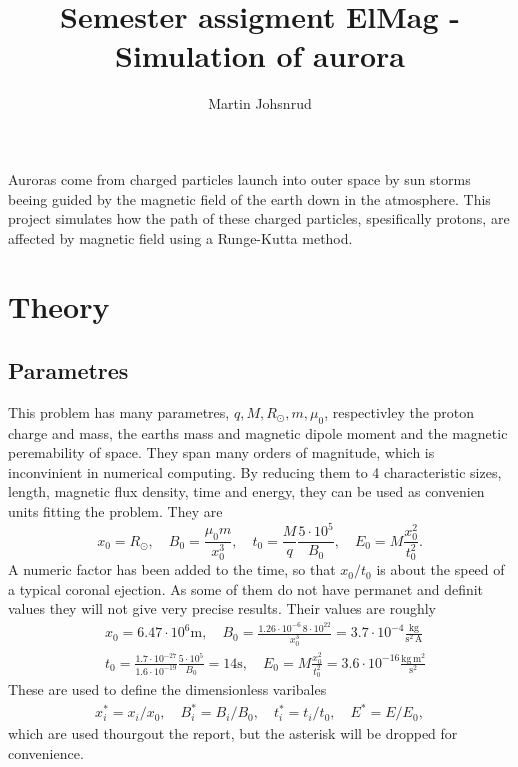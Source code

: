 \documentclass{article}
\title{Semester assigment ElMag - Simulation of aurora}
\author{Martin Johsnrud}
\begin{document}
    \maketitle

    Auroras come from charged particles launch into outer space by sun storms beeing guided by the magnetic field of the earth down in the atmosphere. This project simulates how the path of these charged particles, spesifically protons, are affected by magnetic field using a Runge-Kutta method.
    
    \section*{Theory}
        \subsection*{Parametres}
        This problem has many parametres, $q, M, R_{\odot}, m, \mu_0$, respectivley the proton charge and mass, the earths mass and magnetic dipole moment and the magnetic peremability of space. They span many orders of magnitude, which is inconvinient in numerical computing. By reducing them to 4 characteristic sizes,  length, magnetic flux density, time and energy, they can be used as convenien units fitting the problem. They are
            \begin{equation*}
                x_0 = R_{\odot}, \quad  
                B_0 = \frac{\mu_0 m}{x_0^3}, \quad 
                t_0 = \frac{M}{q}\frac{5\cdot 10^5}{B_0},  \quad 
                E_0 = M\frac{x_0^2}{t_0^2}.
            \end{equation*}
        A numeric factor has been added to the time, so that $x_0 / t_0$ is about the speed of a typical coronal ejection. \cite{Wiki coronal ejections} As some of them do not have permanet and definit values they will not give very precise results. Their values are roughly \cite{Wolfram alpha}
            \begin{align*}
                & x_0 = 6.47 \cdot 10^6 \textrm{m}, \quad
                B_0 = \frac{1.26 \cdot 10^{-6} \, 8 \cdot 10^{22}}{x_0^3} = 3.7 \cdot 10^{-4} \frac{\textrm{kg}}{\textrm{s}^{2} \, \textrm{A}} \\
                &t_0 = \frac{1.7 \cdot 10^{-27}}{1.6\cdot10^{-19}}\frac{5\cdot 10^5}{B_0} = 14 \textrm{s}, \quad 
                E_0 = M\frac{x_0^2}{t_0^2} = 3.6 \cdot 10^{-16} \frac{\textrm{kg} \, \textrm{m}^2}{\textrm{s}^2}
            \end{align*}
        These are used to define the dimensionless varibales
            \begin{align*}
                x_i^* = x_i/x_0, \quad B_i^* = B_i/B_0, \quad t_i^* = t_i/t_0, \quad E^* = E/E_0, 
            \end{align*}
        which are used thourgout the report, but the asterisk will be dropped for convenience.
\end{document}

